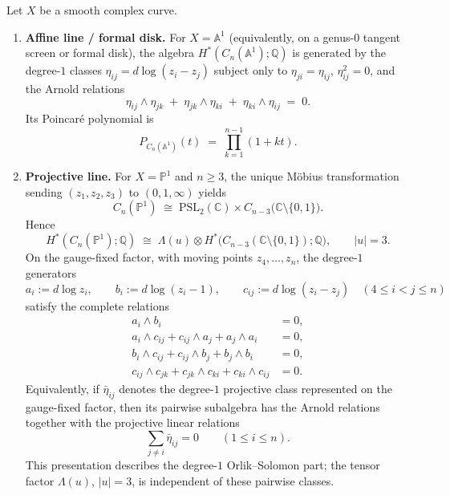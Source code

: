 \begin{proposition}
\label{prop:arnold-higher-genus}
Let $X$ be a smooth complex curve.
\begin{enumerate}
\item \textup{\textbf{Affine line / formal disk.}}
For $X = \mathbb{A}^1$ \textup{(}equivalently, on a genus-$0$ tangent
screen or formal disk\textup{)}, the algebra
$H^*(C_n(\mathbb{A}^1);\mathbb{Q})$ is generated by the degree-$1$
classes $\eta_{ij} = d\log(z_i-z_j)$ subject only to
$\eta_{ji}=\eta_{ij}$, $\eta_{ij}^2=0$, and the Arnold relations
\[
\eta_{ij}\wedge\eta_{jk}
\;+\;
\eta_{jk}\wedge\eta_{ki}
\;+\;
\eta_{ki}\wedge\eta_{ij}
\;=\;0.
\]
Its Poincar\'e polynomial is
\[
P_{C_n(\mathbb{A}^1)}(t)
\;=\;
\prod_{k=1}^{n-1}(1+kt).
\]

\item \textup{\textbf{Projective line.}}
For $X = \mathbb{P}^1$ and $n \geq 3$, the unique M\"obius
transformation sending $(z_1,z_2,z_3)$ to $(0,1,\infty)$ yields
\[
C_n(\mathbb{P}^1)
\;\cong\;
\mathrm{PSL}_2(\mathbb{C})
\times
C_{n-3}\!\bigl(\mathbb{C}\setminus\{0,1\}\bigr).
\]
Hence
\[
H^*(C_n(\mathbb{P}^1);\mathbb{Q})
\;\cong\;
\Lambda(u)
\otimes
H^*\!\bigl(C_{n-3}(\mathbb{C}\setminus\{0,1\});\mathbb{Q}\bigr),
\qquad |u|=3.
\]
On the gauge-fixed factor, with moving points
$z_4,\ldots,z_n$, the degree-$1$ generators
\[
a_i := d\log z_i,\qquad
b_i := d\log(z_i-1),\qquad
c_{ij} := d\log(z_i-z_j)
\quad (4\leq i<j\leq n)
\]
satisfy the complete relations
\begin{align}
a_i\wedge b_i &= 0,\label{eq:p1-projective-rel-1}\\
a_i\wedge c_{ij} + c_{ij}\wedge a_j + a_j\wedge a_i &= 0,\label{eq:p1-projective-rel-2}\\
b_i\wedge c_{ij} + c_{ij}\wedge b_j + b_j\wedge b_i &= 0,\label{eq:p1-projective-rel-3}\\
c_{ij}\wedge c_{jk} + c_{jk}\wedge c_{ki} + c_{ki}\wedge c_{ij} &= 0.\label{eq:p1-projective-rel-4}
\end{align}
Equivalently, if $\bar\eta_{ij}$ denotes the degree-$1$ projective
class represented on the gauge-fixed factor, then its pairwise
subalgebra has the Arnold relations together with the projective linear
relations
\[
\sum_{j\neq i}\bar\eta_{ij}=0
\qquad (1\leq i\leq n).
\]
This presentation describes the degree-$1$ Orlik--Solomon part; the
tensor factor $\Lambda(u)$, $|u|=3$, is independent of these pairwise
classes.


\end{enumerate}
\end{proposition}
